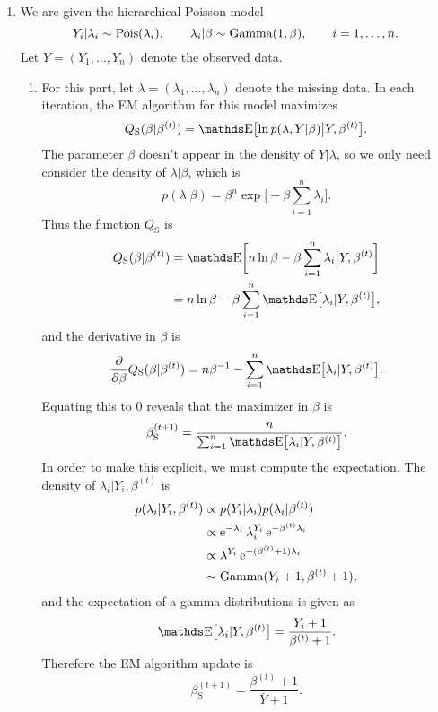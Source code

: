 \begin{enumerate}
\item %
We are given the hierarchical Poisson model
    \[
    Y_i \vert \lambda_i \sim \operatorname{Pois}(\lambda_i),
    \qquad
    \lambda_i \vert \beta \sim \operatorname{Gamma}(1, \beta),
    \qquad
    i = 1, \ldots, n.
    \]
Let $Y = (Y_1, \ldots, Y_n)$ denote the observed data.
    \begin{enumerate}
    \item \label{q:sa}
    For this part, let $\lambda = (\lambda_1, \ldots, \lambda_n)$ denote the
    missing data.
    In each iteration, the EM algorithm for this model maximizes
        \[
        Q_\mathrm{S}(\beta \vert \beta^{(t)})
        =
        \E \bigl[ 
        \ln p(\lambda, Y \vert \beta) \big\vert Y, \beta^{(t)} 
        \bigr].
        \]
    The parameter $\beta$ doesn't appear in the density of $Y \vert \lambda$,
    so we only need consider the density of $\lambda \vert \beta$,
    which is
        \[
        p(\lambda \vert \beta)
        =
        \beta^n \exp\biggl[ -\beta\sum_{i=1}^n \lambda_i \biggr].
        \]
    Thus the function $Q_\mathrm{S}$ is
        \begin{align*}
        Q_\mathrm{S}(\beta \vert \beta^{(t)})
        &=
        \E\biggl[
        n\ln\beta - \beta\sum_{i=1}^n 
        \lambda_i \Big\vert Y, \beta^{(t)}
        \biggr]
        \\ &=
        n\ln\beta - \beta\sum_{i=1}^n 
        \E\bigl[ \lambda_i \vert Y, \beta^{(t)} \bigr],
        \end{align*}
    and the derivative in $\beta$ is
        \[
        \pd{\beta} Q_\mathrm{S}(\beta \vert \beta^{(t)})
        =
        n\beta^{-1} - \sum_{i=1}^n
        \E\bigl[ \lambda_i \vert Y, \beta^{(t)} \bigr].
        \]
    Equating this to 0 reveals that the maximizer in $\beta$ is
        \[
        \beta_\mathrm{S}^{(t+1)}
        =
        \frac{n}{\sum_{i=1}^n \E\bigl[ \lambda_i \vert Y, \beta^{(t)} \bigr]}.
        \]
    In order to make this explicit, we must compute the expectation.
    The density of $\lambda_i \vert Y_i, \beta^{(t)}$ is
        \begin{align*}
        p(\lambda_i \vert Y_i, \beta^{(t)})
        &\propto
        p(Y_i \vert \lambda_i) p(\lambda_i \vert \beta^{(t)})
        \\ &\propto
        \operatorname{e}^{-\lambda_i} \lambda_i^{Y_i} \operatorname{e}^{-\beta^{(t)} \lambda_i}
        \\ &\propto
        \lambda^{Y_i} \operatorname{e}^{-(\beta^{(t)} + 1)\lambda_i}
        \\ &\sim
        \operatorname{Gamma}(Y_i + 1, \beta^{(t)} + 1),
        \end{align*}
    and the expectation of a gamma distributions is given as
        \[
        \E\bigl[ \lambda_i \vert Y, \beta^{(t)} \bigr]
        =
        \frac{Y_i + 1}{\beta^{(t)} + 1}.
        \]
    Therefore the EM algorithm update is
        \begin{equation}
        \label{eqn:sa}
        \beta_\mathrm{S}^{(t+1)}
        =
        \frac{\beta^{(t)} + 1}{\bar{Y} + 1}.
        \end{equation}


\end{enumerate}
\end{enumerate}
